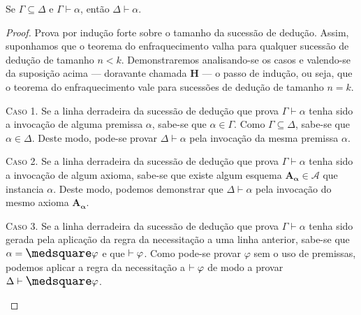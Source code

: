     \begin{theorem}[Enfraquecimento]\label{weakening}
        Se $\Gamma\subseteq\Delta$ e $\Gamma\vdash\alpha$, então $\Delta\vdash\alpha$.
        \begin{proof}
            Prova por indução forte sobre o tamanho da sucessão de dedução.
            Assim, suponhamos que o teorema do enfraquecimento valha para qualquer sucessão de dedução de tamanho $n<k$.
            Demonstraremos analisando-se os casos e valendo-se da suposição acima --- doravante chamada $\mathbf{H}$ --- o passo de indução, ou seja, que o teorema do enfraquecimento vale para sucessões de dedução de tamanho $n=k$.

            \begin{case}
                \textsc{Caso 1.}
                Se a linha derradeira da sucessão de dedução que prova $\Gamma\vdash\alpha$ tenha sido a invocação de alguma premissa $\alpha$, sabe-se que $\alpha\in\Gamma$.
                Como $\Gamma\subseteq\Delta$, sabe-se que $\alpha\in\Delta$.
                Deste modo, pode-se provar $\Delta\vdash\alpha$ pela invocação da mesma premissa $\alpha$.
            \end{case}

            \begin{case}
                \textsc{Caso 2.}
                Se a linha derradeira da sucessão de dedução que prova $\Gamma\vdash\alpha$ tenha sido a invocação de algum axioma, sabe-se que existe algum esquema $\mathbf{A_\alpha}\in\mathcal{A}$ que instancia $\alpha$.
                Deste modo, podemos demonstrar que $\Delta\vdash\alpha$ pela invocação do mesmo axioma $\mathbf{A_\alpha}$.
            \end{case}

            \begin{case}
                \textsc{Caso 3.}
                Se a linha derradeira da sucessão de dedução que prova $\Gamma\vdash\alpha$ tenha sido gerada pela aplicação da regra da necessitação a uma linha anterior, sabe-se que $\alpha=\nec\varphi$ e que ${\mathrel{\vdash}\varphi}$. Como pode-se provar $\varphi$ sem o uso de premissas, podemos aplicar a regra da necessitação a ${\mathrel{\vdash}\varphi}$ de modo a provar ${\Delta\entails\nec\varphi}$.
            \end{case}


\end{proof}
\end{theorem}
